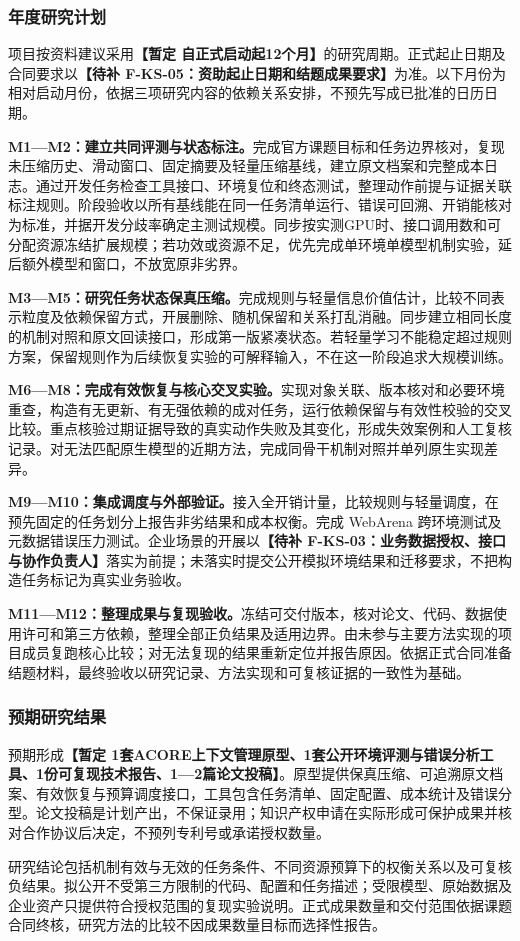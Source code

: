 \justifying
\NSFCBodyText

\subsubsection{年度研究计划}
项目按资料建议采用\textbf{【暂定 自正式启动起12个月】}的研究周期。正式起止日期及合同要求以\textbf{【待补 F-KS-05：资助起止日期和结题成果要求】}为准。以下月份为相对启动月份，依据三项研究内容的依赖关系安排，不预先写成已批准的日历日期。

\textbf{M1—M2：建立共同评测与状态标注。}完成官方课题目标和任务边界核对，复现未压缩历史、滑动窗口、固定摘要及轻量压缩基线，建立原文档案和完整成本日志。通过开发任务检查工具接口、环境复位和终态测试，整理动作前提与证据关联标注规则。阶段验收以所有基线能在同一任务清单运行、错误可回溯、开销能核对为标准，并据开发分歧率确定主测试规模。同步按实测GPU时、接口调用数和可分配资源冻结扩展规模；若功效或资源不足，优先完成单环境单模型机制实验，延后额外模型和窗口，不放宽原非劣界。

\textbf{M3—M5：研究任务状态保真压缩。}完成规则与轻量信息价值估计，比较不同表示粒度及依赖保留方式，开展删除、随机保留和关系打乱消融。同步建立相同长度的机制对照和原文回读接口，形成第一版紧凑状态。若轻量学习不能稳定超过规则方案，保留规则作为后续恢复实验的可解释输入，不在这一阶段追求大规模训练。

\textbf{M6—M8：完成有效恢复与核心交叉实验。}实现对象关联、版本核对和必要环境重查，构造有无更新、有无强依赖的成对任务，运行依赖保留与有效性校验的交叉比较。重点核验过期证据导致的真实动作失败及其变化，形成失效案例和人工复核记录。对无法匹配原生模型的近期方法，完成同骨干机制对照并单列原生实现差异。

\textbf{M9—M10：集成调度与外部验证。}接入全开销计量，比较规则与轻量调度，在预先固定的任务划分上报告非劣结果和成本权衡。完成 WebArena 跨环境测试及元数据错误压力测试。企业场景的开展以\textbf{【待补 F-KS-03：业务数据授权、接口与协作负责人】}落实为前提；未落实时提交公开模拟环境结果和迁移要求，不把构造任务标记为真实业务验收。

\textbf{M11—M12：整理成果与复现验收。}冻结可交付版本，核对论文、代码、数据使用许可和第三方依赖，整理全部正负结果及适用边界。由未参与主要方法实现的项目成员复跑核心比较；对无法复现的结果重新定位并报告原因。依据正式合同准备结题材料，最终验收以研究记录、方法实现和可复核证据的一致性为基础。

\subsubsection{预期研究结果}
预期形成\textbf{【暂定 1套ACORE上下文管理原型、1套公开环境评测与错误分析工具、1份可复现技术报告、1—2篇论文投稿】}。原型提供保真压缩、可追溯原文档案、有效恢复与预算调度接口，工具包含任务清单、固定配置、成本统计及错误分型。论文投稿是计划产出，不保证录用；知识产权申请在实际形成可保护成果并核对合作协议后决定，不预列专利号或承诺授权数量。

研究结论包括机制有效与无效的任务条件、不同资源预算下的权衡关系以及可复核负结果。拟公开不受第三方限制的代码、配置和任务描述；受限模型、原始数据及企业资产只提供符合授权范围的复现实验说明。正式成果数量和交付范围依据课题合同终核，研究方法的比较不因成果数量目标而选择性报告。
